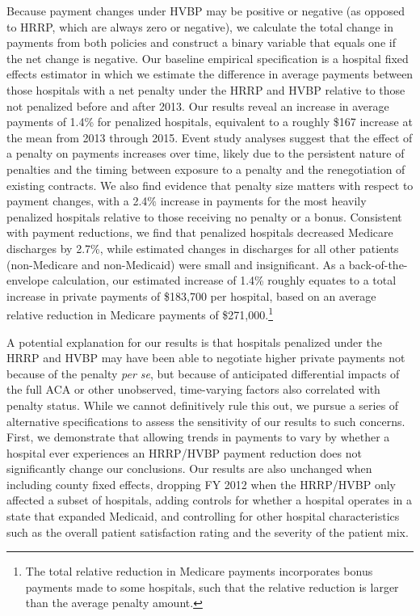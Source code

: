 \documentclass[12pt]{article}
\begin{document}
Because payment changes under HVBP may be positive or negative (as opposed to HRRP, which are always zero or negative), we calculate the total change in payments from both policies and construct a binary variable that equals one if the net change is negative.  Our baseline empirical specification is a hospital fixed effects estimator in which we estimate the difference in average payments between those hospitals with a net penalty under the HRRP and HVBP relative to those not penalized before and after 2013.  Our results reveal an increase in average payments of 1.4\% for penalized hospitals, equivalent to a roughly \$167 increase at the mean from 2013 through 2015. Event study analyses suggest that the effect of a penalty on payments increases over time, likely due to the persistent nature of penalties and the timing between exposure to a penalty and the renegotiation of existing contracts. We also find evidence that penalty size matters with respect to payment changes, with a 2.4$\%$ increase in payments for the most heavily penalized hospitals relative to those receiving no penalty or a bonus. Consistent with payment reductions, we find that penalized hospitals decreased Medicare discharges by 2.7\%, while estimated changes in discharges for all other patients (non-Medicare and non-Medicaid) were small and insignificant. As a back-of-the-envelope calculation, our estimated increase of 1.4\% roughly equates to a total increase in private payments of \$183,700 per hospital, based on an average relative reduction in Medicare payments of \$271,000.\footnote{The total relative reduction in Medicare payments incorporates bonus payments made to some hospitals, such that the relative reduction is larger than the average penalty amount.}


A potential explanation for our results is that hospitals penalized under the HRRP and HVBP may have been able to negotiate higher private payments not because of the penalty \textit{per se}, but because of anticipated differential impacts of the full ACA or other unobserved, time-varying factors also correlated with penalty status. While we cannot definitively rule this out, we pursue a series of alternative specifications to assess the sensitivity of our results to such concerns. First, we demonstrate that allowing trends in payments to vary by whether a hospital ever experiences an HRRP/HVBP payment reduction does not significantly change our conclusions. Our results are also unchanged when including county fixed effects, dropping FY 2012 when the HRRP/HVBP only affected a subset of hospitals, adding controls for whether a hospital operates in a state that expanded Medicaid, and controlling for other hospital characteristics such as the overall patient satisfaction rating and the severity of the patient mix.
\end{document}
